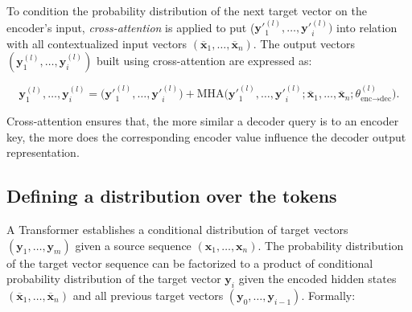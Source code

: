 
To condition the probability distribution of the next target vector on the encoder's input, \textit{cross-attention} is applied to put ($\bm{y}'^{(l)}_1, \ldots, \bm{y}'^{(l)}_i)$ into relation with all contextualized input vectors $(\overline{\bm{x}}_1, \ldots, \overline{\bm{x}}_n)$. The output vectors $(\bm{y}^{(l)}_1, \ldots, \bm{y}^{(l)}_i)$ built using cross-attention are expressed as:

\begin{equation}
    \bm{y}^{(l)}_1, \ldots, \bm{y}^{(l)}_{i} = \bigl(\bm{y}'^{(l)}_1, \ldots, \bm{y}'^{(l)}_{i}\bigr) + \textrm{MHA}\bigl(\bm{y}'^{(l)}_1, \ldots, \bm{y}'^{(l)}_{i}; \overline{\bm{x}}_1, \ldots, \overline{\bm{x}}_n; \theta^{(l)}_{\textrm{enc} \rightarrow \textrm{dec}}\bigr).
\end{equation}



\noindent Cross-attention ensures that, the more similar a decoder query is to an encoder key, the more does the corresponding encoder value influence the decoder output representation.


\subsection{Defining a distribution over the tokens}

A Transformer establishes a conditional distribution of target vectors $(\bm{y}_1, \ldots, \bm{y}_m)$ given a source sequence $(\bm{x}_1, \ldots, \bm{x}_n)$. The probability distribution of the target vector sequence can be factorized to a product of conditional probability distribution of the target vector $\bm{y}_i$ given the encoded hidden states $(\overline{\bm{x}}_1, \ldots, \overline{\bm{x}}_n)$ and all previous target vectors $(\bm{y}_0, \ldots, \bm{y}_{i-1})$. Formally:


